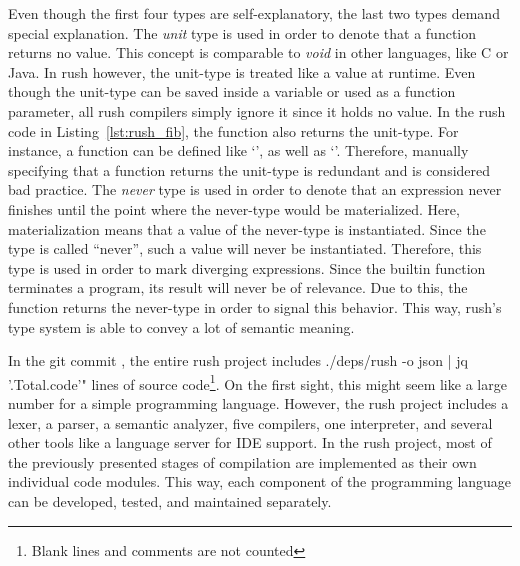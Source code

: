 Even though the first four types are self-explanatory, the last two types demand special explanation.
The \emph{unit} type is used in order to denote that a function returns no value.
This concept is comparable to \emph{void} in other languages, like C or Java.
In rush however, the unit-type is treated like a value at runtime.
Even though the unit-type can be saved inside a variable or used as a function parameter, all rush compilers simply ignore it since it holds no value.
In the rush code in Listing~\ref{lst:rush_fib}, the  function also returns the unit-type.
For instance, a function  can be defined like `', as well as `'.
Therefore, manually specifying that a function returns the unit-type is redundant and is considered bad practice.
The \emph{never} type is used in order to denote that an expression never finishes until the point where the never-type would be materialized.
Here, materialization means that a value of the never-type is instantiated.
Since the type is called \enquote{never}, such a value will never be instantiated.
Therefore, this type is used in order to mark diverging expressions.
Since the builtin  function terminates a program, its result will never be of relevance.
Due to this, the function returns the never-type in order to signal this behavior.
This way, rush's type system is able to convey a lot of semantic meaning.

In the git commit \rushCommit, the entire rush project includes
 ./deps/rush -o json | jq '.Total.code'" lines of source code\footnote{Blank lines and comments are not counted}.
On the first sight, this might seem like a large number for a simple programming language.
However, the rush project includes a lexer, a parser, a semantic analyzer, five compilers, one interpreter, and several other tools like a language server for IDE support.
In the rush project, most of the previously presented stages of compilation are implemented as their own individual code modules.
This way, each component of the programming language can be developed, tested, and maintained separately.
